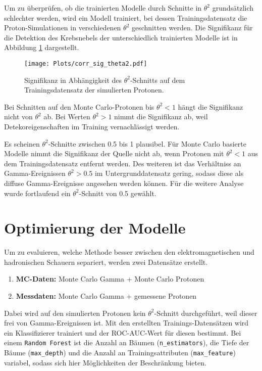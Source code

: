 Um zu überprüfen, ob die trainierten Modelle durch Schnitte in $\theta^{2}$ grundsätzlich schlechter werden, wird ein Modell trainiert, bei dessen Trainingsdatensatz die Proton-Simulationen in verschiedenen $\theta^{2}$ geschnitten werden. 
Die Signifikanz für die Detektion des Krebsnebels der unterschiedlich trainierten Modelle ist in Abbildung \ref{fig:corrtheta} dargestellt.
\begin{figure}[H]
  \centering
  \texttt{[image: Plots/corr\_sig\_theta2.pdf]}
  \caption{Signifikanz in Abhängigkeit des $\theta^{2}$-Schnitts auf dem Trainingsdatensatz der simulierten Protonen.}
  \label{fig:corrtheta}
\end{figure}
Bei Schnitten auf den Monte Carlo-Protonen bis $\theta^{2} < 1$ hängt die Signifikanz nicht von $\theta^{2}$ ab.
Bei Werten $\theta^{2} > 1$ nimmt die Signifikanz ab, weil Detekoreigenschaften im Training vernachlässigt werden.

Es scheinen $\theta^{2}$-Schnitte zwischen \num{0.5} bis \num{1} plausibel. 
Für Monte Carlo basierte Modelle nimmt die Signifikanz der Quelle nicht ab, wenn Protonen mit $\theta^{2} < \num{1}$ aus dem Trainingsdatensatz entfernt werden. 
Des weiteren ist das Verhältniss an Gamma-Ereignissen $\theta^{2} > \num{0.5}$ im Untergrunddatensatz gering, sodass diese als diffuse Gamma-Ereignisse angesehen werden können. 
Für die weitere Analyse wurde fortlaufend ein $\theta^{2}$-Schnitt von \num{0.5} gewählt. 
\newpage
\section{Optimierung der Modelle}
Um zu evaluieren, welche Methode besser zwischen den elektromagnetischen und hadronischen Schauern separiert, werden zwei Datensätze erstellt. 
\begin{enumerate}
  \item \textbf{MC-Daten:} Monte Carlo Gamma + Monte Carlo Protonen
  \item \textbf{Messdaten:} Monte Carlo Gamma + gemessene Protonen 
\end{enumerate}
Dabei wird auf den simulierten Protonen kein $\theta^{2}$-Schnitt durchgeführt, weil dieser frei von Gamma-Ereignissen ist.
Mit den erstellten Trainings-Datensätzen wird ein Klassifizierer trainiert und der ROC-AUC-Wert für diesen bestimmt.
Bei einem \texttt{Random Forest} ist die Anzahl an Bäumen (\texttt{n\_estimators}), die Tiefe der Bäume (\texttt{max\_depth}) und die Anzahl an Trainingsattributen (\texttt{max\_feature}) variabel, sodass sich hier Möglichkeiten der Beschränkung bieten.

